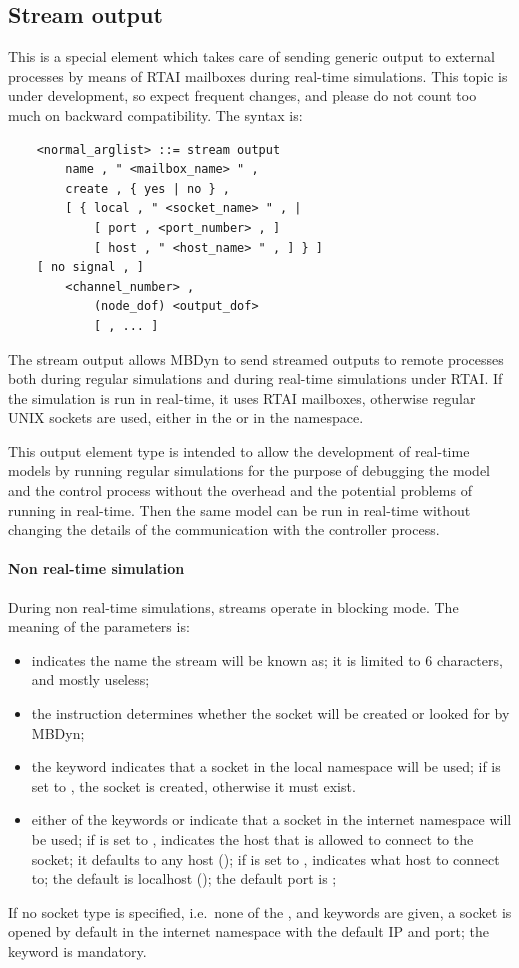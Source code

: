 \subsection{Stream output}\label{sec:EL:BASE:STREAM_OUTPUT}
This is a special element which takes care of sending generic output
to external processes by means of RTAI mailboxes during real-time 
simulations.
This topic is under development, so expect frequent changes, and
please do not count too much on backward compatibility.
The syntax is:
\begin{verbatim}
    <normal_arglist> ::= stream output
        name , " <mailbox_name> " ,
        create , { yes | no } ,
        [ { local , " <socket_name> " , |
            [ port , <port_number> , ]
            [ host , " <host_name> " , ] } ]
	[ no signal , ]
        <channel_number> ,
            (node_dof) <output_dof>
            [ , ... ]
\end{verbatim}
The stream output allows MBDyn to send streamed outputs 
to remote processes both during regular simulations and during 
real-time simulations under RTAI.
If the simulation is run in real-time, it uses RTAI mailboxes, 
otherwise regular UNIX sockets are used, either in the  or 
in the  namespace.

This output element type is intended to allow the development 
of real-time models by running regular simulations for the purpose 
of debugging the model and the control process without the overhead 
and the potential problems of running in real-time.
Then the same model can be run in real-time without changing the details
of the communication with the controller process.

\paragraph{Non real-time simulation}
During non real-time simulations, streams operate in blocking mode.
The meaning of the parameters is:
\begin{itemize}
\item {} indicates the name the stream
will be known as; it is limited to 6 characters, and mostly useless;
\item the instruction  determines whether the socket will be
created or looked for by MBDyn;
\item the keyword  indicates that a socket 
in the local namespace will be used; if  is set to ,
the socket is created, otherwise it must exist.
\item either of the keywords  or  indicate that a socket
in the internet namespace will be used;
if  is set to ,  indicates 
the host that is allowed to connect to the socket; it defaults 
to any host (); if  is set to ,
 indicates what host to connect to; the default 
is localhost (); the default port is ;
\end{itemize}
If no socket type is specified, i.e.\ none of the ,  
and  keywords are given, a socket is opened by default 
in the internet namespace with the default IP and port; the 
keyword is mandatory.

